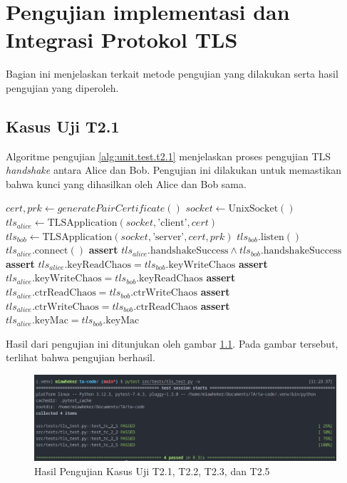 \chapter{{{Pengujian implementasi dan Integrasi Protokol TLS}}} 
\label{appendix:unit.test.tls}

Bagian ini menjelaskan terkait metode pengujian yang dilakukan serta hasil pengujian yang diperoleh.

\section{Kasus Uji T2.1}

Algoritme pengujian \ref{alg:unit.test.t2.1} menjelaskan proses pengujian TLS \emph{handshake} antara Alice dan Bob. Pengujian ini dilakukan untuk memastikan bahwa kunci yang dihasilkan oleh Alice dan Bob sama.

\begin{algorithm}
  \caption{Algoritme Pengujian Kasus Uji T2.1}
  \label{alg:unit.test.t2.1}
  \begin{algorithmic}
    \State $cert, prk \gets generatePairCertificate()$
    \State $socket \gets \text{UnixSocket}()$ 
    \State $tls_{alice} \gets \text{TLSApplication}(socket, \text{'client'}, cert)$ 
    \State $tls_{bob} \gets \text{TLSApplication}(socket, \text{'server'}, cert, prk)$
    \State
    \State $tls_{bob}.\text{listen}()$  
    \State $tls_{alice}.\text{connect}()$  
    \State
    \State \textbf{assert} $tls_{alice}.\text{handshakeSuccess} \land tls_{bob}.\text{handshakeSuccess}$
    \State \textbf{assert} $tls_{alice}.\text{keyReadChaos} = tls_{bob}.\text{keyWriteChaos}$
    \State \textbf{assert} $tls_{alice}.\text{keyWriteChaos} = tls_{bob}.\text{keyReadChaos}$
    \State \textbf{assert} $tls_{alice}.\text{ctrReadChaos} = tls_{bob}.\text{ctrWriteChaos}$
    \State \textbf{assert} $tls_{alice}.\text{ctrWriteChaos} = tls_{bob}.\text{ctrReadChaos}$
    \State \textbf{assert} $tls_{alice}.\text{keyMac} = tls_{bob}.\text{keyMac}$
  \end{algorithmic}
\end{algorithm}

Hasil dari pengujian ini ditunjukan oleh gambar \ref{fig:unit.test.t2.1}. Pada gambar tersebut, terlihat bahwa pengujian berhasil.

\begin{figure}[ht]
  \centering
  \includegraphics[width=\textwidth]{chapters/res/appendix-4/tls_test.png}
  \caption{Hasil Pengujian Kasus Uji T2.1, T2.2, T2.3, dan T2.5}
  \label{fig:unit.test.t2.1}
\end{figure}

